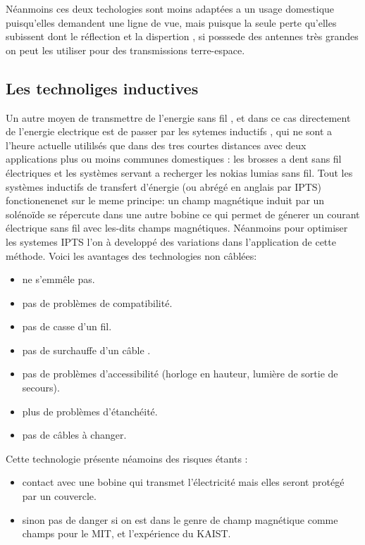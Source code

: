 \documentclass[12pt]{report}
\begin{document}
  Néanmoins ces deux techologies sont moins adaptées a un usage domestique puisqu'elles demandent une ligne de vue, mais puisque la seule perte qu'elles subissent dont le réflection et la dispertion , si posssede des antennes très grandes on peut les utiliser pour des transmissions terre-espace.
\subsection{Les technoliges inductives}
  Un autre moyen de transmettre de l'energie sans fil , et dans ce cas directement de l'energie electrique est de passer par les sytemes inductifs , qui ne sont a l'heure actuelle utililsés que dans des tres courtes distances avec deux applications plus ou moins communes domestiques : les brosses a dent sans fil électriques et les systèmes servant a recherger les nokias lumias sans fil. Tout les systèmes inductifs de transfert d'énergie (ou abrégé en anglais par IPTS) fonctionenenet sur le meme principe: un champ magnétique induit par un solénoïde se répercute dans une autre bobine ce qui permet de génerer un courant électrique sans fil avec les-dits champs magnétiques. Néanmoins pour optimiser les systemes IPTS l'on à developpé des variations dans l'application de cette méthode.
Voici les avantages des technologies non câblées:
\begin{itemize}
	\item ne s'emmêle pas.
	\item pas de problèmes de compatibilité.
	\item pas de casse d'un fil.
	\item pas de surchauffe d'un câble .
	\item pas de problèmes d'accessibilité (horloge en hauteur, lumière de sortie de secours).
	\item plus de problèmes d'étanchéité.
	\item pas de câbles à changer.
\end{itemize}
Cette technologie présente néamoins des risques étants :
\begin{itemize}
	\item contact avec une bobine qui transmet l'électricité mais elles seront protégé par un couvercle.
	\item sinon pas de danger si on est dans le genre de champ magnétique comme champs pour le MIT, et l'expérience du KAIST.
\end{itemize}
\end{document}

